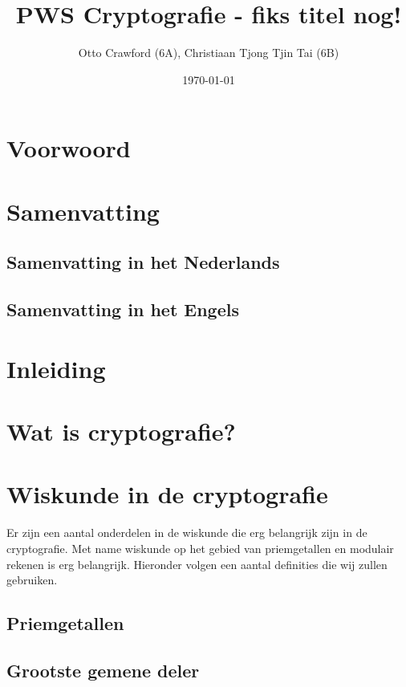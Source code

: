 \documentclass{report} %
\title{PWS Cryptografie - fiks titel nog!}
\author{Otto Crawford (6A), Christiaan Tjong Tjin Tai (6B)}
\date{\today}
\begin{document}
\maketitle

\tableofcontents

\chapter{Voorwoord}

\chapter{Samenvatting}
\section{Samenvatting in het Nederlands}
\section{Samenvatting in het Engels}


\chapter{Inleiding}

\chapter{Wat is cryptografie?}

\chapter{Wiskunde in de cryptografie}
Er zijn een aantal onderdelen in de wiskunde die erg belangrijk zijn in de cryptografie. Met name wiskunde op het gebied van priemgetallen en modulair rekenen is erg belangrijk. Hieronder volgen een aantal definities die wij zullen gebruiken.
\section{Priemgetallen}

\section{Grootste gemene deler}
\end{document}
